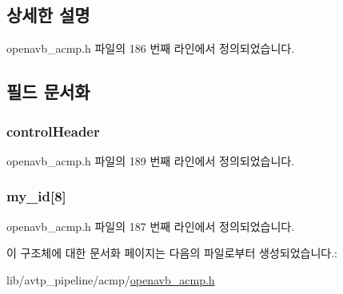 \subsection{상세한 설명}


openavb\+\_\+acmp.\+h 파일의 186 번째 라인에서 정의되었습니다.



\subsection{필드 문서화}
\subsubsection[{\texorpdfstring{control\+Header}{controlHeader}}]{ control\+Header}\hypertarget{structopenavb__acmp__sm__global__vars__t_ab8b927414a6fac6fb2c845292107825b}{}\label{structopenavb__acmp__sm__global__vars__t_ab8b927414a6fac6fb2c845292107825b}


openavb\+\_\+acmp.\+h 파일의 189 번째 라인에서 정의되었습니다.

\subsubsection[{\texorpdfstring{my\+\_\+id}{my_id}}]{ my\+\_\+id\mbox{[}8\mbox{]}}\hypertarget{structopenavb__acmp__sm__global__vars__t_abea1c7f5c4a2c027508c48e6e2880bd5}{}\label{structopenavb__acmp__sm__global__vars__t_abea1c7f5c4a2c027508c48e6e2880bd5}


openavb\+\_\+acmp.\+h 파일의 187 번째 라인에서 정의되었습니다.



이 구조체에 대한 문서화 페이지는 다음의 파일로부터 생성되었습니다.\+:\begin{DoxyCompactItemize}
\item 
lib/avtp\+\_\+pipeline/acmp/\hyperlink{openavb__acmp_8h}{openavb\+\_\+acmp.\+h}\end{DoxyCompactItemize}
